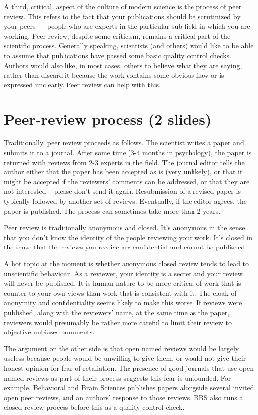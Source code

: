 \documentclass[12pt]{article}
\begin{document}
A third, critical, aspect of the culture of modern science is the
process of peer review. This refers to the fact that your publications
should be scrutinized by your peers --- people who are experts in the
particular sub-field in which you are working. Peer review, despite
some criticism, remains a critical part of the scientific
process. Generally speaking, scientists (and others) would like to be
able to assume that publications have passed some basic quality
control checks. Authors would also like, in most cases, others to
believe what they are saying, rather than discard it because the work
contains some obvious flaw or is expressed unclearly. Peer review can
help with this.

\section{Peer-review process (2 slides)}

Traditionally, peer review proceeds as follows. The scientist writes a
paper and submits it to a journal. After some time (3-4 months in
psychology), the paper is returned with reviews from 2-3 experts in
the field. The journal editor tells the author either that the paper
has been accepted as is (very unlikely), or that it might be accepted
if the reviewers' comments can be addressed, or that they are not
interested -- please don't send it again. Resubmission of a revised
paper is typically followed by another set of reviews. Eventually, if
the editor agrees, the paper is published. The process can sometimes
take more than 2 years.

Peer review is traditionally anonymous and closed. It's anonymous in
the sense that you don't know the identity of the people reviewing
your work. It's closed in the sense that the reviews you receive are
confidential and cannot be published.

A hot topic at the moment is whether anonymous closed review tends to
lead to unscientific behaviour. As a reviewer, your identity is a
secret and your review will never be published. It is human nature to
be more critical of work that is counter to your own views than work
that is consistent with it. The cloak of anonymity and confidentiality
seems likely to make this worse. If reviews were published, along with
the reviewers' name, at the same time as the paper, reviewers would
presumably be rather more careful to limit their review to objective
unbiased comments.

The argument on the other side is that open named reviews would be
largely useless because people would be unwilling to give them, or
would not give their honest opinion for fear of retaliation. The
presence of good journals that use open named reviews as part of their
process suggests this fear is unfounded. For example, Behavioral and
Brain Sciences publishes papers alongside several invited open peer
reviews, and an authors' response to those reviews. BBS also runs a
closed review process before this as a quality-control check.
\end{document}
